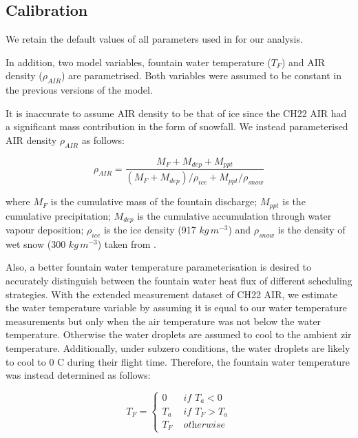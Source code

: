 \documentclass[tc, manuscript]{copernicus}
\begin{document}
\subsection{Calibration}

We retain the default values of all parameters used in
\cite{balasubramanianInfluenceMeteorologicalConditions2022} for our analysis.  

In addition, two model variables, fountain water temperature ($T_F$) and AIR density ($\rho_{AIR}$) are
parametrised. Both variables were assumed to be constant in the previous versions of the model. 

It is inaccurate to assume AIR density to be that of ice since the CH22 AIR had a significant mass contribution
in the form of snowfall. We instead parameterised AIR density $\rho_{AIR}$ as follows:

\begin{equation}
  \rho_{AIR} = \frac{M_{F} + M_{dep} + M_{ppt}}{(M_{F} + M_{dep})/\rho_{ice} + M_{ppt}/\rho_{snow}}
\end{equation}

where $M_F$ is the cumulative mass of the fountain discharge; $M_{ppt}$ is the cumulative precipitation; $M_{dep}$ is the cumulative accumulation through water vapour deposition; $\rho_{ice}$ is the ice density (917 $kg\,m^{-3}$) and $\rho_{snow}$ is the density of wet snow (300 $kg\,m^{-3}$) taken from
\cite{cuffeyPhysicsGlaciers2010} .

Also, a better fountain water temperature parameterisation is desired to accurately distinguish between the
fountain water heat flux of different scheduling strategies. With the extended measurement dataset of CH22 AIR,
we estimate the water temperature variable by assuming it is equal to our water temperature measurements but
only when the air temperature was not below the water temperature. Otherwise the water droplets are assumed to
cool to the ambient zir temperature. Additionally, under subzero conditions, the water droplets are likely to
cool to 0 C during their flight time. Therefore, the fountain water temperature was instead determined as
follows:

\begin{equation}
	T_{F} = \left\{ \begin{array}{ll}
		0 & \textit{ if } T_{a} < 0 \\
		T_a & \textit{ if } T_{F} > T_a \\
		T_{F} & \textit{ otherwise}
	\end{array} \right.
\end{equation}
\end{document}
